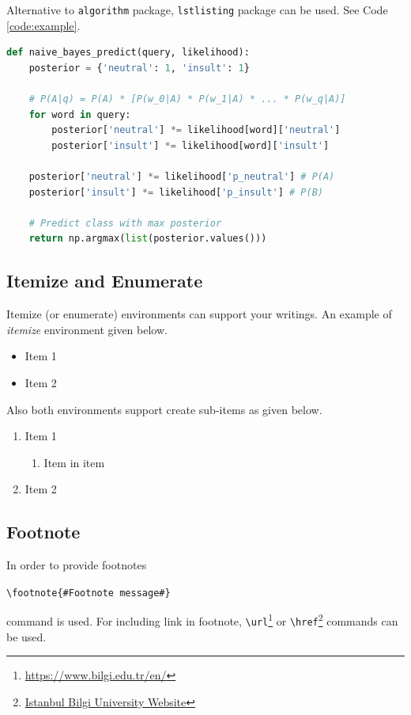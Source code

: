 \documentclass[a4paper,12pt]{article}
\newcommand{\writecommand}[2]{
    \begin{center}
        \texttt{\textbackslash #1\{\##2\#\}} \\
    \end{center}
}
\begin{document}
Alternative to \texttt{algorithm} package, \texttt{lstlisting} package can be used. See Code \ref{code:example}.

\begin{lstlisting}[language=Python, caption=An listing example, label={code:example}]
def naive_bayes_predict(query, likelihood):
    posterior = {'neutral': 1, 'insult': 1}

    # P(A|q) = P(A) * [P(w_0|A) * P(w_1|A) * ... * P(w_q|A)]
    for word in query:
        posterior['neutral'] *= likelihood[word]['neutral']
        posterior['insult'] *= likelihood[word]['insult']

    posterior['neutral'] *= likelihood['p_neutral'] # P(A)
    posterior['insult'] *= likelihood['p_insult'] # P(B)

    # Predict class with max posterior
    return np.argmax(list(posterior.values()))
\end{lstlisting}


\subsection{Itemize and Enumerate}
Itemize (or enumerate) environments can support your writings. An example of \textit{itemize} environment given below.

\begin{itemize}
    \item Item 1
    \item Item 2
\end{itemize}

Also both environments support create sub-items as given below.

\begin{enumerate}
    \item Item 1
    \begin{enumerate}
        \item Item in item
    \end{enumerate}
    \item Item 2
\end{enumerate}


\subsection{Footnote}
In order to provide footnotes \writecommand{footnote}{Footnote message} command is used. For including link in footnote, \texttt{\textbackslash url}\footnote{\url{https://www.bilgi.edu.tr/en/}} or \texttt{\textbackslash href}\footnote{\href{https://www.bilgi.edu.tr/en/}{Istanbul Bilgi University Website}} commands can be used.
\end{document}
